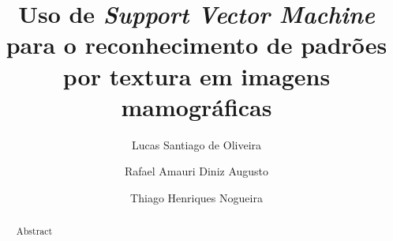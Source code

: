 \documentclass[11pt]{article}
\title{Uso de \emph{Support Vector Machine} para o reconhecimento de padrões por textura em imagens mamográficas}
\author{Lucas Santiago de Oliveira\inst{1}\and Rafael Amauri Diniz Augusto\inst{1}\and Thiago Henriques Nogueira\inst{1}}
\begin{document}
    \maketitle

    \begin{abstract}
        Abstract
    \end{abstract}
\end{document}
